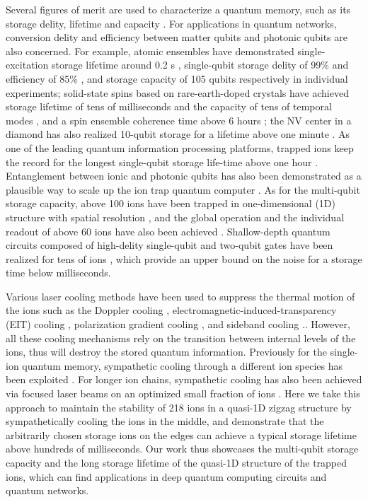 Several figures of merit are used to characterize a quantum memory, such as its storage delity, lifetime and capacity \cite{lvovsky2009optical}. For applications in quantum networks, conversion delity and efficiency between matter qubits and photonic qubits are also concerned. For example, atomic ensembles have demonstrated single-excitation storage lifetime around 0.2 s \cite{yang2016efficient}, single-qubit storage delity of 99\% and efficiency of 85\% \cite{wang2019efficient}, and storage capacity of 105 qubits respectively in individual experiments; solid-state spins based on rare-earth-doped crystals have achieved storage lifetime of tens of milliseconds \cite{ortu2022storage} and the capacity of tens of temporal modes \cite{lago2021telecom}, and a spin ensemble coherence time above 6 hours \cite{zhong2015optically}; the NV center in a diamond has also realized 10-qubit storage for a lifetime above one minute \cite{bradley2019ten}. As one of the leading quantum information processing platforms, trapped ions keep the record for the longest single-qubit storage life-time above one hour \cite{wang2021single}. Entanglement between ionic and photonic qubits has also been demonstrated \cite{blinov2004observation,stute2012tunable,hucul2015modular,bock2018high,krutyanskiy2019light} as a plausible way to scale up the ion trap quantum computer \cite{duan2010colloquium,hucul2015modular}. As for the multi-qubit storage capacity, above 100 ions have been trapped in one-dimensional (1D) structure with spatial resolution \cite{pagano2018cryogenic}, and the global operation and the individual readout of above 60 ions have also been achieved \cite{li2023probing}. Shallow-depth quantum circuits composed of high-delity single-qubit and two-qubit gates have been realized for tens of ions \cite{egan2021fault,postler2022demonstration}, which provide an upper bound on the noise for a storage time below milliseconds.

Various laser cooling methods have been used to suppress the thermal motion of the ions such as the Doppler cooling \cite{leibfried2003quantum}, electromagnetic-induced-transparency (EIT) cooling \cite{qiao2021double, feng2020efficient}, polarization gradient cooling \cite{joshi2020polarization}, and sideband cooling \cite{leibfried2003quantum}.. However, all these cooling mechanisms rely on the transition between internal levels of the ions, thus will destroy the stored quantum information. Previously for the single-ion quantum memory, sympathetic cooling through a different ion species has been exploited \cite{wang2021single,chen2017sympathetic, blinov2002sympathetic, barrett2003sympathetic}. For longer ion chains, sympathetic cooling has also been achieved via focused laser beams on an optimized small fraction of ions \cite{mao2021experimental}. Here we take this approach to maintain the stability of 218 ions in a quasi-1D zigzag structure by sympathetically cooling the ions in the middle, and demonstrate that the arbitrarily chosen storage ions on the edges can achieve a typical storage lifetime above hundreds of milliseconds. Our work thus showcases the multi-qubit storage capacity and the long storage lifetime of the quasi-1D structure of the trapped ions, which can find applications in deep quantum computing circuits and quantum networks.

